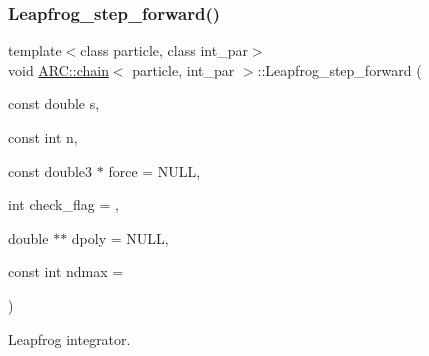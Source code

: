 \subsubsection{\texorpdfstring{Leapfrog\+\_\+step\+\_\+forward()}{Leapfrog\_step\_forward()}}
{\footnotesize\ttfamily template$<$class particle, class int\+\_\+par$>$ \\
void \hyperlink{classARC_1_1chain}{A\+R\+C\+::chain}$<$ particle, int\+\_\+par $>$\+::Leapfrog\+\_\+step\+\_\+forward (\begin{DoxyParamCaption}\item[{const double}]{s,  }\item[{const int}]{n,  }\item[{const double3 $\ast$}]{force = {\ttfamily NULL},  }\item[{int}]{check\+\_\+flag = {},  }\item[{double $\ast$$\ast$}]{dpoly = {\ttfamily NULL},  }\item[{const int}]{ndmax = {} }\end{DoxyParamCaption})\hspace{0.3cm}{\ttfamily [inline]}}



Leapfrog integrator. 


